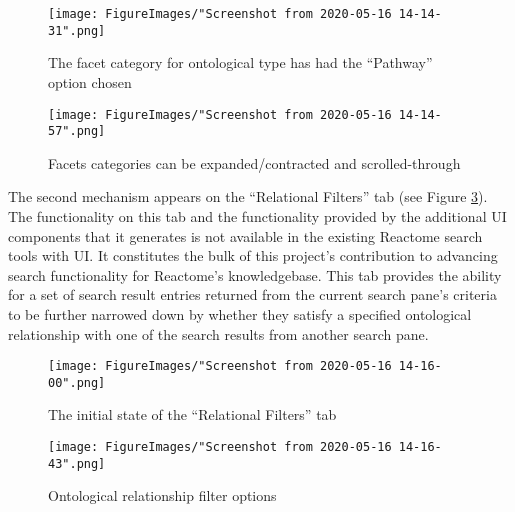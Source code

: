 \documentclass[12pt]{report}
\begin{document}
\begin{figure}[h!]
	\begin{center}
		\texttt{[image: FigureImages/"Screenshot from 2020-05-16 14-14-31".png]}
	\end{center}
	\caption{The facet category for ontological type has had the ``Pathway'' option chosen}
	\label{fig:AdvancedSearchPathwayFacetOptionChosen}
\end{figure}

\begin{figure}[h!]
	\begin{center}
		\texttt{[image: FigureImages/"Screenshot from 2020-05-16 14-14-57".png]}
	\end{center}
	\caption{Facets categories can be expanded/contracted and scrolled-through}
	\label{fig:AdvancedSearchFacetExpandAndScroll}
\end{figure}

\newpage

The second mechanism appears on the ``Relational Filters'' tab (see Figure \ref{fig:RelationalFiltersTabInitial}). The functionality on this tab and the functionality provided by the additional UI components that it generates is not available in the existing Reactome search tools with UI. It constitutes the bulk of this project's contribution to advancing search functionality for Reactome's knowledgebase. This tab provides the ability for a set of search result entries returned from the current search pane's criteria to be further narrowed down by whether they satisfy a specified ontological relationship with one of the search results from another search pane.

\newpage

\begin{figure}[h!]
	\begin{center}
		\texttt{[image: FigureImages/"Screenshot from 2020-05-16 14-16-00".png]}
	\end{center}
	\caption{The initial state of the ``Relational Filters'' tab}
	\label{fig:RelationalFiltersTabInitial}
\end{figure}

\begin{figure}[h!]
	\begin{center}
		\texttt{[image: FigureImages/"Screenshot from 2020-05-16 14-16-43".png]}
	\end{center}
	\caption{Ontological relationship filter options}
	\label{fig:OntologicalRelationshipFilterOptions}
\end{figure}
\end{document}
